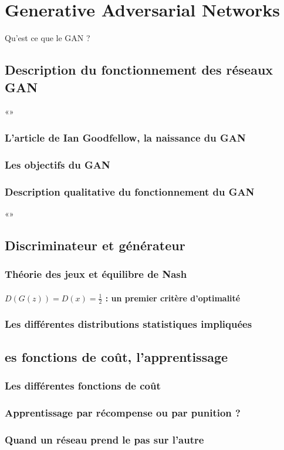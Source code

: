 \chapter{Generative Adversarial Networks}

Qu'est ce que le GAN ?
\section{Description du fonctionnement des réseaux GAN}«»
\subsection {L'article de Ian Goodfellow, la naissance du GAN}
\subsection{Les objectifs du GAN}
\subsection{Description qualitative du fonctionnement du GAN}«»

\section{Discriminateur et générateur}
\subsection{Théorie des jeux et équilibre de Nash}
\subsubsection{$D(G(z)) = D(x) = \frac{1}{2}$ : un premier critère d'optimalité}
\subsection{Les différentes distributions statistiques impliquées}
\section{es fonctions de coût, l'apprentissage}
\subsection{Les différentes fonctions de coût}
\subsection{Apprentissage par récompense ou par punition ?}
\subsection{Quand un réseau prend le pas sur l'autre}
